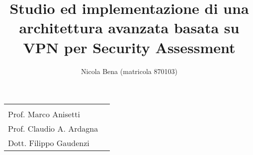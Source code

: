 \documentclass[10pt,a4paper]{article}
\begin{document}
        \title{\textbf{Studio ed implementazione di una architettura avanzata
        basata su VPN per Security Assessment}}
        \author{Nicola Bena (matricola 870103)}
        \date{}

        \maketitle

        \vspace{0.5cm}

        \begin{minipage}{\linewidth}
            \begin{tabular}{l r}
                \begin{minipage}[t]{.4\linewidth}
                    \begin{flushleft}
                        {%
                            RELATORE\\[.15cm]
                            Prof. Marco Anisetti
                        }
                    \end{flushleft}
                \end{minipage}
                &
                \begin{minipage}[t]{.53\linewidth}
                    \begin{flushright}
                        {%
                            CORRELATORI\\[.15cm]
                            Prof. Claudio A. Ardagna\\[.1cm]
                            Dott. Filippo Gaudenzi
                        }
                    \end{flushright}
                \end{minipage}
            \end{tabular}
        \end{minipage}

        \vspace{2cm}

\end{document}
